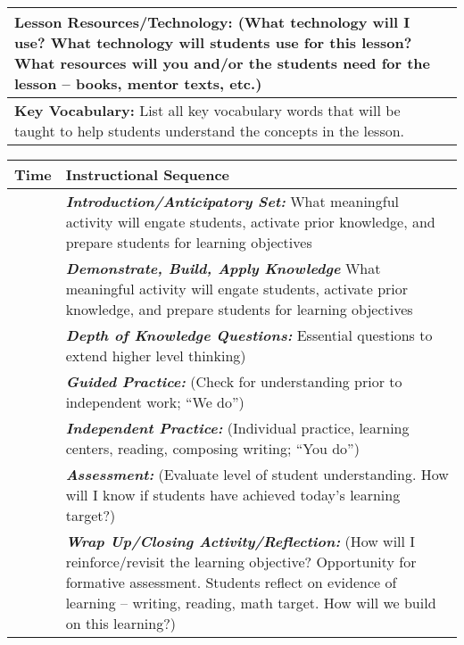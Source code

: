 \begin{tabularx}{\textwidth}{|X|X|}
      \textbf{Lesson Resources/Technology: } {\tiny (What
        technology will I use? What technology will students
        use for this lesson? What resources will you and/or the
        students need for the lesson – books, mentor texts,
        etc.)} \\ \hline
      
      \textbf{Key Vocabulary:} {\tiny List all key vocabulary
        words that will be taught to help students understand
        the concepts in the lesson.} \\ \hline
\end{tabularx}

\pagebreak

\begin{tabularx}{\textwidth}{|p{0.5in}|X|}
  \hline
  \centerline{\textbf{\large Time}} &  \textbf{\large Instructional Sequence } \\
  \hline
  \textbf{} &  \textbf{\em Introduction/Anticipatory Set:} {\tiny What meaningful activity will engate students, activate prior knowledge, and prepare students for learning objectives} \\
  \hline
  \textbf{} &  \textbf{\em Demonstrate, Build, Apply Knowledge} {\tiny What meaningful activity will engate students, activate prior knowledge, and prepare students for learning objectives} \\
  \hline
  \textbf{} &  \textbf{\em Depth of Knowledge Questions:} {\tiny Essential questions to extend higher level thinking)
} \\
  \hline
  \textbf{} &  \textbf{\em Guided Practice:} {\tiny (Check for understanding prior to independent work; “We do”)} \\
  \hline
  \textbf{} &  \textbf{\em Independent Practice:} {\tiny (Individual practice, learning centers, reading, composing writing; “You do”)} \\
  \hline
  \textbf{} &  \textbf{\em Assessment:} {\tiny (Evaluate level of student understanding. How will I know if students have achieved today’s learning target?)} \\
  \hline
  \textbf{} &  \textbf{\em Wrap Up/Closing Activity/Reflection:} {\tiny (How will I reinforce/revisit the learning objective? Opportunity for formative assessment. Students reflect on evidence of learning – writing, reading, math target. How will we build on this learning?)} \\
  \hline
\end{tabularx}

\vskip 6pt

